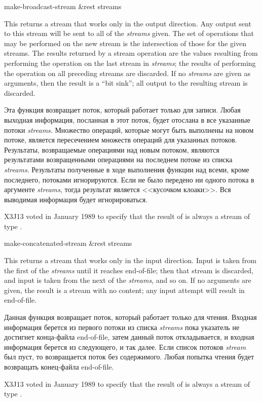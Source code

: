 \begin{defun}[Function]
make-broadcast-stream &rest streams

This returns a stream that works only in the output direction.  Any output
sent to this stream will be sent to all of the \emph{streams} given.
The set of
operations that may be performed on the new stream is the intersection
of those for the given streams.  The results returned by a stream
operation are the values resulting from
performing the operation on the last stream in \emph{streams}; the
results of performing the operation on all preceding streams are
discarded.
If no \emph{streams} are given as arguments, then the result
is a ``bit sink''; all output to the resulting stream is discarded.

Эта функция возвращает поток, который работает только для записи. Любая выходная
информация, посланная в этот поток, будет отослана в все указанные потоки
\emph{streams}.
Множество операций, которые могут быть выполнены на новом потоке, является
пересечением множеств операций для указанных потоков. Результаты, возвращаемые
операциями над новым потоком, являются результатами возвращенными операциями на
последнем потоке из списка \emph{streams}.
Результаты полученные в ходе выполнения функции над всеми, кроме последнего,
потоками игнорируются.
Если не было передено ни одного потока в аргументе \emph{streams}, тогда
результат является <<кусочком клоаки>>. Вся выводимая информация будет
игнорироваться.
\begin{new}
X3J13 voted in January 1989
to specify that the result of
 is always a stream of type .
\end{new}
\end{defun}

\begin{defun}[Function]
make-concatenated-stream &rest streams

This returns a stream that works only in the input direction.
Input is taken from the first of the \emph{streams} until it reaches
end-of-file; then that stream is discarded, and input is taken
from the next of the \emph{streams}, and so on.  If no arguments
are given, the result is a stream with no content; any input attempt
will result in end-of-file.

Данная функция возвращает поток, который работает только для чтения.
Входная информация берется из первого потоки из списка \emph{streams} пока
указатель не достигнет конца-файла end-of-file, затем данный поток
откладывается, и входная информация берется из следующего, и так далее. Если
список потоков \emph{stream} был пуст, то возвращается поток без
содержимого. Любая попытка чтения будет возвращать конец-файла end-of-file. 
\begin{new}
X3J13 voted in January 1989
to specify that the result of
 is always a stream of type .
\end{new}
\end{defun}

